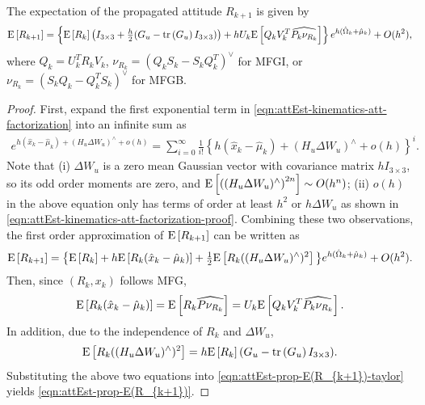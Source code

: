 \begin{theorem} \label{thm:attEst-prop-E(R_{k+1})}
	The expectation of the propagated attitude $R_{k+1}$ is given by
	\begin{align} \label{eqn:attEst-prop-E(R_{k+1})}
		\expect{R_{k+1}} = \left\{ \expect{R_k}\left( I_{3\times 3} + \tfrac{h}{2}(G_u-\tr{G_u}I_{3\times 3}) \right) + hU_k\expect{Q_kV_k^T\widehat{P_k\nu_{R_k}}} \right\} e^{h(\hat{\Omega}_k+\hat{\mu}_k)} + O(h^2),
	\end{align}
	where $Q_k=U_k^TR_kV_k$, $\nu_{R_k} = (Q_kS_k-S_kQ_k^T)^\vee$ for MFGI, or $\nu_{R_k} = (S_kQ_k-Q_k^TS_k)^\vee$ for MFGB.
\end{theorem}
\begin{proof}
	First, expand the first exponential term in \eqref{eqn:attEst-kinematics-att-factorization} into an infinite sum as
	\begin{align}
		e^{h (\hat x_k-\hat{\mu}_k) + (H_u\Delta W_u)^\wedge + o(h)} = \sum_{i=0}^\infty \tfrac{1}{i!}\left\{ h (\hat x_k-\hat{\mu}_k) + (H_u\Delta W_u)^\wedge + o(h) \right\}^i.
	\end{align}
	Note that (i) $\Delta W_u$ is a zero mean Gaussian vector with covariance matrix $hI_{3\times3}$, so its odd order moments are zero, and $\mathrm{E}\left[ \left((H_u\Delta W_u)^\wedge\right)^{2n} \right] \sim O(h^n)$; (ii) $o(h)$ in the above equation only has terms of order at least $h^2$ or $h\Delta W_u$ as shown in \eqref{eqn:attEst-kinematics-att-factorization-proof}.
	Combining these two observations, the first order approximation of $\mathrm{E}\left[ R_{k+1} \right]$ can be written as
	\begin{align} \label{eqn:attEst-prop-E(R_{k+1})-taylor}
		\expect{R_{k+1}} = \big\{ \expect{R_k} + h \expect{R_k(\hat x_k-\hat{\mu}_k)} + \tfrac{1}{2}\expect{R_k((H_u\Delta W_u)^\wedge)^2} \big\} e^{h(\hat{\Omega}_k+\hat{\mu}_k)} + O(h^2).
	\end{align}
	Then, since $(R_k,x_k)$ follows MFG,
	\begin{align*}
		\mathrm{E}\left[ R_k(\hat x_k-\hat{\mu}_k) \right] = \mathrm{E}\left[ R_k\widehat{P\nu_{R_k}} \right] = U_k\mathrm{E}\left[ Q_kV_k^T\widehat{P_k\nu_{R_k}} \right].
	\end{align*}
	In addition, due to the independence of $R_k$ and $\Delta W_u$,
	\begin{align*}
		\mathrm{E}\left[ R_k((H_u\Delta W_u)^\wedge)^2 \right] = h\mathrm{E}\left[ R_k \right](G_u-\mathrm{tr}\left( G_u \right)I_{3\times 3}).
	\end{align*}
	Substituting the above two equations into \eqref{eqn:attEst-prop-E(R_{k+1})-taylor} yields \eqref{eqn:attEst-prop-E(R_{k+1})}.
\end{proof}

